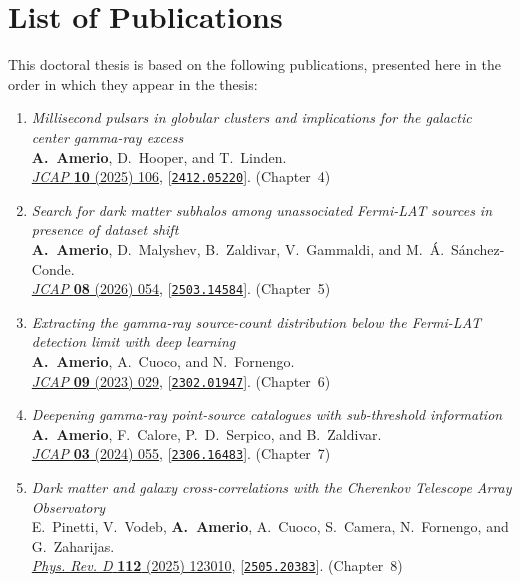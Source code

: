 \chapter*{List of Publications}

This doctoral thesis is based on the following publications, presented here in
the order in which they appear in the thesis:
%
\begin{enumerate}
	\item \emph{Millisecond pulsars in globular clusters and implications for the galactic center gamma-ray excess}~\cite{Amerio:2024qor}\\
	      \textbf{A.~Amerio}, D.~Hooper, and T.~Linden.\\
	      \href{https://doi.org/10.1088/1475-7516/2025/10/106}{\emph{JCAP} {\bf 10} (2025) 106}, [\href{https://arxiv.org/abs/2412.05220}{\tt 2412.05220}]. \hfill (Chapter~4)
	\item \emph{Search for dark matter subhalos among unassociated Fermi-LAT sources in presence of dataset shift}~\cite{Amerio:2025fhz}\\
	      \textbf{A.~Amerio}, D.~Malyshev, B.~Zaldivar, V.~Gammaldi, and M.~\'A.~S\'anchez-Conde.\\
	      \href{https://doi.org/10.1088/1475-7516/2026/08/054}{\emph{JCAP} {\bf 08} (2026) 054}, [\href{https://arxiv.org/abs/2503.14584}{\tt 2503.14584}]. \hfill (Chapter~5)
	\item \emph{Extracting the gamma-ray source-count distribution below the Fermi-LAT detection limit with deep learning}~\cite{Amerio:2023uet}\\
	      \textbf{A.~Amerio}, A.~Cuoco, and N.~Fornengo.\\
	      \href{https://doi.org/10.1088/1475-7516/2023/09/029}{\emph{JCAP} {\bf 09} (2023) 029}, [\href{https://arxiv.org/abs/2302.01947}{\tt 2302.01947}]. \hfill (Chapter~6)
	\item \emph{Deepening gamma-ray point-source catalogues with sub-threshold information}~\cite{Amerio:2023rjn}\\
	      \textbf{A.~Amerio}, F.~Calore, P.~D.~Serpico, and B.~Zaldivar.\\
	      \href{https://doi.org/10.1088/1475-7516/2024/03/055}{\emph{JCAP} {\bf 03} (2024) 055}, [\href{https://arxiv.org/abs/2306.16483}{\tt 2306.16483}]. \hfill (Chapter~7)
	\item \emph{Dark matter and galaxy cross-correlations with the Cherenkov Telescope Array Observatory}~\cite{Pinetti:2025hgd}\\
	      E.~Pinetti, V.~Vodeb, \textbf{A.~Amerio}, A.~Cuoco, S.~Camera, N.~Fornengo, and G.~Zaharijas.\\
	      \href{https://doi.org/10.1103/1xtk-hf1s}{\emph{Phys. Rev. D} {\bf 112} (2025) 123010}, [\href{https://arxiv.org/abs/2505.20383}{\tt 2505.20383}]. \hfill (Chapter~8)
\end{enumerate}

